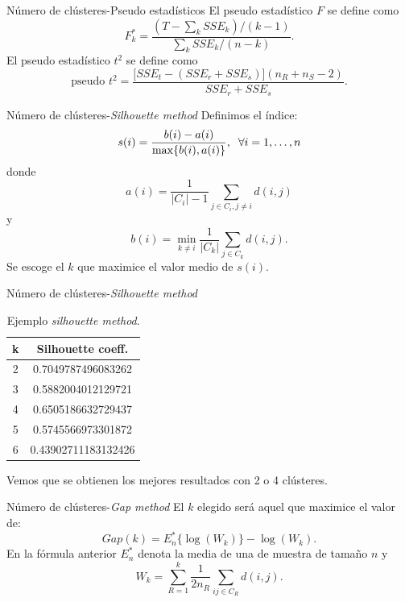 \documentclass[spanish]{beamer}
\begin{document}
\begin{frame}{Número de clústeres-Pseudo estadísticos}
	El pseudo estadístico $ F $ se define como
	\[
	F^*_k = \frac{(T-\sum_k SSE_k) / (k-1)}{\sum_k SSE_k / (n-k)}.
	\]
	El pseudo estadístico $ t^2 $ se define como
	\[
	\text{pseudo }t^2 = \frac{\lbrack SSE_t - (SSE_r + SSE_s)\rbrack(n_R + n_S - 2)}{SSE_r + SSE_s}.
	\]
\end{frame}

\begin{frame}{Número de clústeres-\textit{Silhouette method}}
	Definimos el índice:
	\[
	s(i) = \frac{b(i)-a(i)}{\max\{b(i), a(i)\}}, \hspace{2mm} \forall i = 1, \dots, n
	\] 
	donde 
	\[
	a(i) = \frac{1}{|C_i|-1}\sum_{j\in C_i, j \neq i} d(i,j) 
	\]	y
	\[
	b(i) = \min_{k \neq i} \frac{1}{|C_k|} \sum_{j \in C_k} d(i,j).
	\] 
	Se escoge el $ k $ que maximice el valor medio de $ s(i) $.
\end{frame}

\begin{frame}{Número de clústeres-\textit{Silhouette method}}
	\begin{table}[h!]
		\centering
		\begin{tabular}{cc} 
			\hline
			k & Silhouette coeff. \\
			\hline
			2 &  0.7049787496083262 \\			 
			3 & 0.5882004012129721 \\	
			4 &  0.6505186632729437 \\
			5 &  0.5745566973301872 \\
			6 & 0.43902711183132426 \\
			\hline
		\end{tabular}
		\caption{Ejemplo \textit{silhouette method}.}
	\end{table}
	Vemos que se obtienen los mejores resultados con 2 o 4 clústeres.
\end{frame}

\begin{frame}{Número de clústeres-\textit{Gap method}}
	El $ k $ elegido será aquel que maximice el valor de:
	\[
	Gap(k) = E^*_n\{ \log(W_k)\} - \log(W_k).
	\]
	En la fórmula anterior $ E^*_n $ denota la media de una de muestra de tamaño $ n $ y 
	\[
	W_k = \sum_{R = 1}^{k}\frac{1}{2 n_R}\sum_{i j \in C_R} d(i,j).
	\]
\end{frame}
\end{document}
